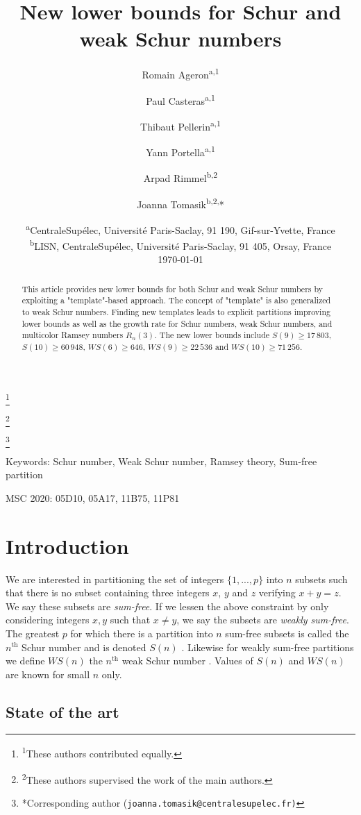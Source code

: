 \documentclass{article}
\title{New lower bounds for Schur and weak Schur numbers}
\author{
Romain Ageron\textsuperscript{a,1}\and
Paul Casteras\textsuperscript{a,1}\and
Thibaut Pellerin\textsuperscript{a,1}\and
Yann Portella\textsuperscript{a,1}\and
Arpad Rimmel\textsuperscript{b,2}\and
Joanna Tomasik\textsuperscript{b,2,}*
}
\date{
	\textsuperscript{a}CentraleSup\'elec, Universit\'e{} Paris-Saclay, 91 190, Gif-sur-Yvette, France\\
	\textsuperscript{b}LISN, CentraleSup\'elec, Universit\'e{} Paris-Saclay, 91 405, Orsay, France\\[2ex]
	\today
}
\newtheorem{computational theorem}[definition]{Computational Theorem}
\newcommand{\WS}{\mathit{WS}}
\newcommand\blfootnote[1]{%
  \begingroup
  \renewcommand\thefootnote{}\footnote{#1}%
  \addtocounter{footnote}{-1}%
  \endgroup
}
\begin{document}
\maketitle

\blfootnote{\textsuperscript{1}These authors contributed equally.}
\blfootnote{\textsuperscript{2}These authors supervised the work of the main authors.}
\blfootnote{*Corresponding author (\tt{joanna.tomasik@centralesupelec.fr})}
\vspace{-5ex}

\begin{abstract}
This article provides new lower bounds for both Schur and weak Schur numbers by exploiting a "template"-based approach.
The concept of "template" is also generalized to weak Schur numbers. Finding new templates leads to explicit partitions
improving lower bounds as well as the growth rate for Schur numbers, weak Schur numbers, and multicolor Ramsey numbers \(R_n(3)\).
The new lower bounds include \(S(9) \geqslant 17\,803\), \(S(10) \geqslant 60\,948\), \(\WS(6) \geqslant 646\),
\(\WS (9) \geqslant 22\,536\) and \(\WS (10) \geqslant 71\,256 \).
\end{abstract}

Keywords: Schur number, Weak Schur number, Ramsey theory, Sum-free partition

MSC 2020: 05D10, 05A17, 11B75, 11P81


\section{Introduction}

We are interested in partitioning the set of integers \(\{1, ..., p\}\) into \(n\) subsets such that there is no
subset containing three integers \(x\), \(y\) and \(z\) verifying \(x + y = z\). We say these subsets are
\textit{sum-free}. If we lessen the above constraint by only considering integers \(x,y\) such that \(x \neq y\), we say the subsets are \textit{weakly sum-free}. The
greatest \(p\) for which there is a partition into \(n\) sum-free subsets is called the \(n^{\text{th}}\) Schur
number and is denoted \(S(n)\) \cite{Schur1917}. Likewise for weakly sum-free partitions we define \(\WS(n)\)
the \(n^{\text{th}}\) weak Schur number \cite{Irving1973}. Values of \(S(n)\) and \(\WS(n)\) are known for small \(n\) only.


\subsection{State of the art}
\end{document}
